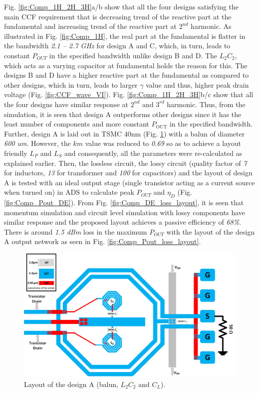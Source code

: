 \documentclass[conference]{IEEEtran}
\begin{document}
Fig. \ref{fig:Comp_1H_2H_3H}a/b show that all the four designs satisfying the main CCF requirement that is decreasing trend of the reactive part at the fundamental and increasing trend of the reactive part at $2^{nd}$ harmonic.
As illustrated in Fig. \ref{fig:Comp_1H}, the real part at the fundamental is flatter in the bandwidth \textit{2.1 -- 2.7 GHz} for design A and C, which, in turn, leads to constant $P_{OUT}$ in the specified bandwidth unlike design B and D. The $L_2C_2$, which acts as a varying capacitor at fundamental holds the reason for this. The designs B and D have a higher reactive part at the fundamental as compared to other designs, which in turn, leads to larger $\gamma$ value and thus, higher peak drain voltage (Fig. \ref{fig:CCF_wave_VI}). Fig. \ref{fig:Comp_1H_2H_3H}b/c show that all the four designs have similar response at $2^{nd}$ and $3^{rd}$ harmonic. Thus, from the simulation, it is seen that design A outperforms other designs since it has the least number of components and more constant $P_{\text{OUT}}$ in the specified bandwidth. 
Further, design A is laid out in TSMC 40nm (Fig. \ref{fig:ON_X1}) with a balun of diameter \textit{600 um}. However, the $km$ value was reduced to \textit{0.69} so as to achieve a layout friendly $L_P$ and $L_S$ and consequently, all the parameters were re-calculated as explained earlier. Then, the lossless circuit, the lossy circuit (quality factor of \textit{7} for inductors, \textit{13} for transformer and \textit{100} for capacitors) and the layout of design A is tested with an ideal output stage (single transistor acting  as a current source when turned on) in ADS to calculate peak $P_{OUT}$ and $\eta_D$ (Fig. \ref{fig:Comp_Pout_DE}). From Fig. \ref{fig:Comp_DE_loss_layout}, it is seen that momentum simulation and circuit level simulation with lossy components have similar response and the proposed layout achieves a passive efficiency of \textit{68\%}. There is around \textit{1.5 dBm} loss in the maximum $P_{OUT}$ with the layout of the design A output network as seen in Fig. \ref{fig:Comp_Pout_loss_layout}.

\begin{figure}[!t]
\centering
\captionsetup{font=footnotesize}
\includegraphics[width=1\linewidth]{Images/Output_Network_Comp/Balun_V1.jpg}
\caption{Layout of the design A (balun, $L_2C_2$ and $C_L$).}
\label{fig:ON_X1}
\vspace{-0.1in}
\end{figure}
\end{document}
